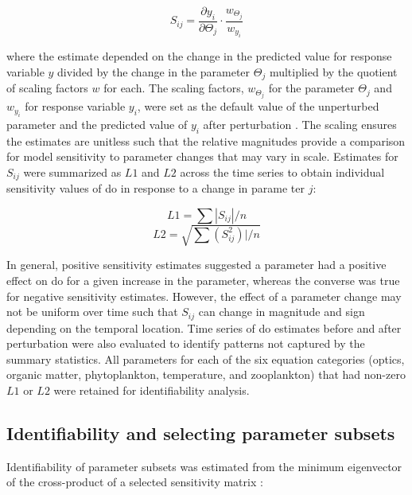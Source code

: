 \documentclass[letterpaper,12pt,oneside]{article}\usepackage[]{graphicx}\usepackage[]{color}
\begin{document}
\begin{equation} \label{sijeqn}
S_{ij} = \frac{\partial y_i}{\partial \Theta_j}\cdot\frac{w_{\Theta_j}}{w_{y_i}}
\end{equation}

\noindent where the estimate depended on the change in the predicted value for response variable $y$ divided by the change in the parameter $\Theta_j$ multiplied by the quotient of scaling factors $w$ for each.  The scaling factors, $w_{\Theta_j}$ for the parameter $\Theta_j$ and $w_{y_i}$ for response variable $y_i$, were set as the default value of the unperturbed parameter and the predicted value of $y_i$ after perturbation \citep{Soetaert10}.  The scaling ensures the estimates are unitless such that the relative magnitudes provide a comparison for model sensitivity to parameter changes that may vary in scale.  Estimates for $S_{ij}$ were summarized as $L1$ and $L2$ across the time series to obtain individual sensitivity values of \ac{do} in response to a change in parame ter $j$:

\begin{equation} \label{l1}
L1 = \sum|S_{ij}|/n
\end{equation}
\begin{equation} \label{l2}
L2 = \sqrt{\sum\left(S_{ij}^2\right)|/n}
\end{equation}

In general, positive sensitivity estimates suggested a parameter had a positive effect on \ac{do} for a given increase in the parameter, whereas the converse was true for negative sensitivity estimates.  However, the effect of a parameter change may not be uniform over time such that $S_{ij}$ can change in magnitude and sign depending on the temporal location.  Time series of \ac{do} estimates before and after perturbation were also evaluated to identify patterns not captured by the summary statistics. All parameters for each of the six equation categories (optics, organic matter, phytoplankton, temperature, and zooplankton) that had non-zero $L1$ or $L2$ were retained for identifiability analysis.  

\subsection{Identifiability and selecting parameter subsets}

Identifiability of parameter subsets was estimated from the minimum eigenvector of the cross-product of a selected sensitivity matrix \citep{Brun01,Omlin01}:
\end{document}
